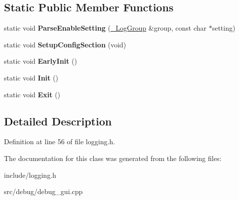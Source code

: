 \subsection*{Static Public Member Functions}
\begin{DoxyCompactItemize}
\item 
\hypertarget{classLOG_a0b59409f78773976e66e69f16573993f}{static void {\bfseries Parse\-Enable\-Setting} (\hyperlink{struct__LogGroup}{\-\_\-\-Log\-Group} \&group, const char $\ast$setting)}\label{classLOG_a0b59409f78773976e66e69f16573993f}

\item 
\hypertarget{classLOG_a1e8af0f7428258c7e2c09956ae839755}{static void {\bfseries Setup\-Config\-Section} (void)}\label{classLOG_a1e8af0f7428258c7e2c09956ae839755}

\item 
\hypertarget{classLOG_af9ac43bd4010a457a34a36d3740d8080}{static void {\bfseries Early\-Init} ()}\label{classLOG_af9ac43bd4010a457a34a36d3740d8080}

\item 
\hypertarget{classLOG_a9ff0b5f893a739f45fe3a4cb5cebe2ec}{static void {\bfseries Init} ()}\label{classLOG_a9ff0b5f893a739f45fe3a4cb5cebe2ec}

\item 
\hypertarget{classLOG_acb0baa890b37cb7e285b92dbdbebba82}{static void {\bfseries Exit} ()}\label{classLOG_acb0baa890b37cb7e285b92dbdbebba82}

\end{DoxyCompactItemize}


\subsection{Detailed Description}


Definition at line 56 of file logging.\-h.



The documentation for this class was generated from the following files\-:\begin{DoxyCompactItemize}
\item 
include/logging.\-h\item 
src/debug/debug\-\_\-gui.\-cpp\end{DoxyCompactItemize}
